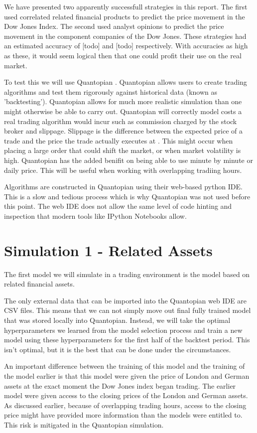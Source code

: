 \documentclass{report}
\begin{document}
We have presented two apparently successfull strategies in this report. The first used correlated related financial products to predict the price movement in the Dow Jones Index. The second used analyst opinions to predict the price movement in the component companies of the Dow Jones. These strategies had an estimated accuracy of [todo] and [todo] respectively. With accuracies as high as these, it would seem logical then that one could profit their use on the real market.

To test this we will use Quantopian \cite{quantopian}. Quantopian allows users to create trading algorithms and test them rigorously against historical data (known as 'backtesting'). Quantopian allows for much more realistic simulation than one might otherwise be able to carry out. Quantopian will correctly model costs a real trading algorithm would incur such as commission charged by the stock broker and slippage. Slippage is the difference between the expected price of a trade and the price the trade actually executes at \cite{slippage}. This might occur when placing a large order that could shift the market, or when market volatility is high. Quantopian has the added benifit on being able to use minute by minute or daily price. This will be useful when working with overlapping tradiing hours.

Algorithms are constructed in Quantopian using their web-based python IDE. This is a slow and tedious process which is why Quantopian was not used before this point. The web IDE does not allow the same level of code hinting and inspection that modern tools like IPython Notebooks allow.

\section{Simulation 1 - Related Assets}

The first model we will simulate in a trading environment is the model based on related financial assets. 

The only external data that can be imported into the Quantopian web IDE are CSV files. This means that we can not simply move out final fully trained model that was stored locally into Quantopian. Instead, we will take the optimal hyperparameters we learned from the model selection process and train a new model using these hyperparameters for the first half of the backtest period. This isn't optimal, but it is the best that can be done under the circumstances.

An important difference between the training of this model and the training of the model earlier is that this model were given the price of London and German assets at the exact moment the Dow Jones index began trading. The earlier model were given access to the closing prices of the London and German assets. As discussed earlier, because of overlapping trading hours, access to the closing price might have provided more information than the models were entitled to. This risk is mitigated in the Quantopian simulation.
\end{document}
